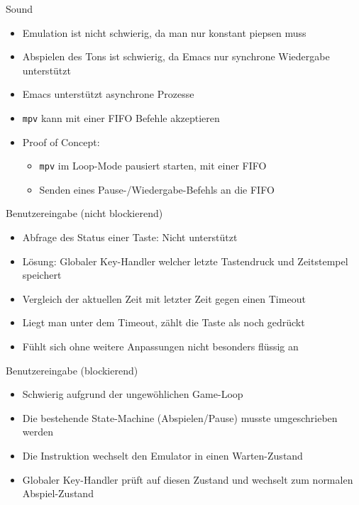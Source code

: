 \documentclass[presentation]{beamer}
\begin{document}
\begin{frame}[fragile,label={sec:orgaaba775}]{Sound}
 \begin{itemize}
\item Emulation ist nicht schwierig, da man nur konstant piepsen muss
\item Abspielen des Tons ist schwierig, da Emacs nur synchrone Wiedergabe
unterstützt
\item Emacs unterstützt asynchrone Prozesse
\item \texttt{mpv} kann mit einer FIFO Befehle akzeptieren
\item Proof of Concept:
\begin{itemize}
\item \texttt{mpv} im Loop-Mode pausiert starten, mit einer FIFO
\item Senden eines Pause-/Wiedergabe-Befehls an die FIFO
\end{itemize}
\end{itemize}
\end{frame}

\begin{frame}[label={sec:org6998b7b}]{Benutzereingabe (nicht blockierend)}
\begin{itemize}
\item Abfrage des Status einer Taste: Nicht unterstützt
\item Lösung: Globaler Key-Handler welcher letzte Tastendruck und
Zeitstempel speichert
\item Vergleich der aktuellen Zeit mit letzter Zeit gegen einen Timeout
\item Liegt man unter dem Timeout, zählt die Taste als noch gedrückt
\item Fühlt sich ohne weitere Anpassungen nicht besonders flüssig an
\end{itemize}
\end{frame}

\begin{frame}[label={sec:orgc7fabd6}]{Benutzereingabe (blockierend)}
\begin{itemize}
\item Schwierig aufgrund der ungewöhlichen Game-Loop
\item Die bestehende State-Machine (Abspielen/Pause) musste umgeschrieben
werden
\item Die Instruktion wechselt den Emulator in einen Warten-Zustand
\item Globaler Key-Handler prüft auf diesen Zustand und wechselt zum
normalen Abspiel-Zustand
\end{itemize}
\end{frame}
\end{document}
